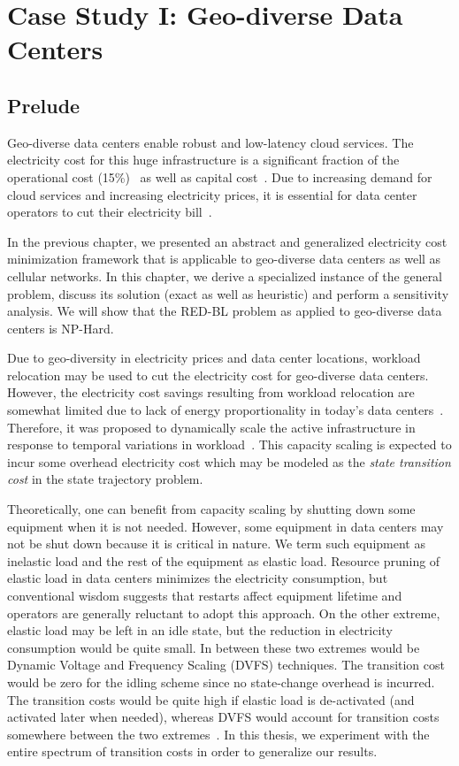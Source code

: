 \chapter{Case Study I: Geo-diverse Data Centers}
\label{chap:casestudy1}
\section{Prelude}
Geo-diverse data centers enable robust and low-latency cloud services. The electricity cost for this huge infrastructure is a significant fraction of the operational cost (15\%)~\cite{costCloud} as well as capital cost~\cite{qureshiHotnets}. Due to increasing demand for cloud services and increasing electricity prices, it is essential for data center operators to cut their electricity bill~\cite{brill:DataCenterCrisis:UI:2007,Belady_EC_2007}.

In the previous chapter, we presented an abstract and generalized electricity cost minimization framework that is applicable to geo-diverse data centers as well as cellular networks. In this chapter, we derive a specialized instance of the general problem, discuss its solution (exact as well as heuristic) and perform a sensitivity analysis.  We will show that the RED-BL problem as applied to geo-diverse data centers is NP-Hard. 

Due to geo-diversity in electricity prices and data center locations, workload relocation may be used to cut the electricity cost for geo-diverse data centers. However, the electricity cost savings resulting from workload relocation are somewhat limited due to lack of energy proportionality in today's data centers~\cite{10.1109/MC.2007.443}. Therefore, it was proposed to dynamically scale the active infrastructure in response to temporal variations in workload~\cite{10.1109/MC.2007.443,qureshi2009cutting}. This capacity scaling is expected to incur some overhead electricity cost which may be modeled as the \textit{state transition cost} in the state trajectory problem. 

Theoretically, one can benefit from capacity scaling by shutting down some equipment when it is not needed. However, some equipment in data centers may not be shut down because it is critical in nature. We term such equipment as inelastic load and the rest of the equipment as elastic load. Resource pruning of elastic load in data centers minimizes the electricity consumption, but conventional wisdom suggests that restarts affect equipment lifetime and operators are generally reluctant to adopt this approach. On the other extreme, elastic load may be left in an idle state, but the reduction in electricity  consumption would be quite small. In between these two extremes would be Dynamic Voltage and Frequency Scaling (DVFS) techniques. The transition cost would be zero for the idling scheme since no state-change overhead is incurred. The transition costs would be quite high if elastic load is de-activated (and activated later when needed), whereas DVFS would account for transition costs somewhere between the two extremes~\cite{Meisner:2009:PES:1508244.1508269}. In this thesis, we experiment with the entire spectrum of transition costs in order to generalize our results.

